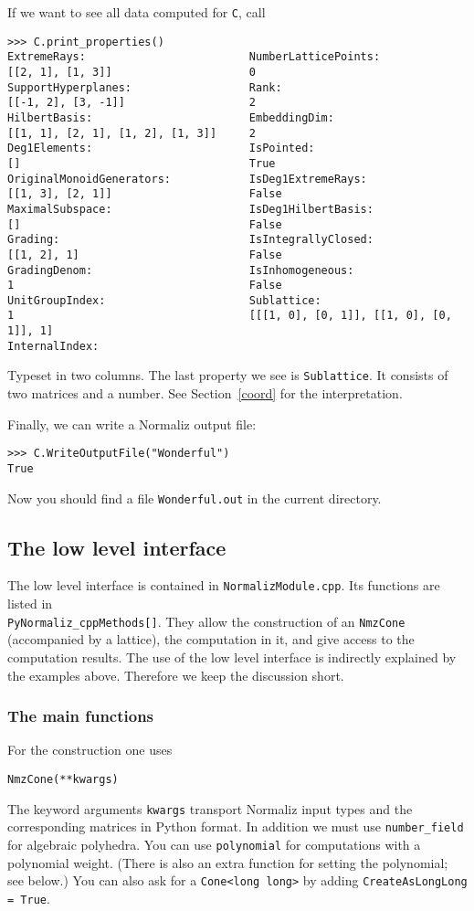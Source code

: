 \documentclass[12pt,a4paper]{scrartcl}
\theoremstyle{definition}
\def\ttt{\texttt}
\begin{document}
\begin{small}
If we want to see all data computed for \verb|C|, call
\begin{Verbatim}
>>> C.print_properties()
ExtremeRays:                         NumberLatticePoints:
[[2, 1], [1, 3]]                     0
SupportHyperplanes:                  Rank:
[[-1, 2], [3, -1]]                   2
HilbertBasis:                        EmbeddingDim:
[[1, 1], [2, 1], [1, 2], [1, 3]]     2
Deg1Elements:                        IsPointed:
[]                                   True
OriginalMonoidGenerators:            IsDeg1ExtremeRays:
[[1, 3], [2, 1]]                     False
MaximalSubspace:                     IsDeg1HilbertBasis:
[]                                   False
Grading:                             IsIntegrallyClosed:
[[1, 2], 1]                          False
GradingDenom:                        IsInhomogeneous:
1                                    False
UnitGroupIndex:                      Sublattice:
1                                    [[[1, 0], [0, 1]], [[1, 0], [0, 1]], 1]
InternalIndex:
\end{Verbatim}
Typeset in two columns. The last property we see is \verb|Sublattice|. It consists of two matrices and a number. See Section~\ref{coord} for the interpretation.

Finally, we can write a Normaliz output file:
\begin{Verbatim}
>>> C.WriteOutputFile("Wonderful")
True
\end{Verbatim}
Now you should find a file \verb|Wonderful.out| in the current directory.

\subsection{The low level interface}

The low level interface is contained in \ttt{NormalizModule.cpp}. Its functions are listed in\\ \verb|PyNormaliz_cppMethods[]|. They allow the construction of an \verb|NmzCone| (accompanied by a lattice), the computation in it, and give access to the computation results. The use of the low level interface is indirectly explained by the examples above. Therefore we keep the discussion short.

\subsubsection{The main functions}

For the construction one uses
\begin{Verbatim}
NmzCone(**kwargs)
\end{Verbatim}
The keyword arguments \ttt{kwargs} transport Normaliz input types and the corresponding matrices in Python format. In addition we must use \ttt{number\_field} for algebraic polyhedra. You can use \ttt{polynomial} for computations with a polynomial weight. (There is also an extra function for setting the polynomial; see below.) You can also ask for a \verb|Cone<long long>| by adding \verb|CreateAsLongLong = True|.


\end{small}
\end{document}
